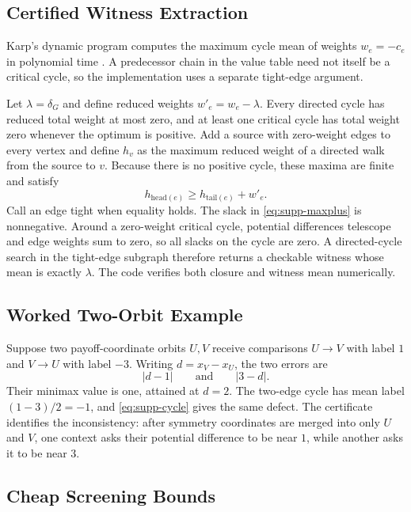 \subsection{Certified Witness Extraction}

Karp's dynamic program computes the maximum cycle mean of weights $w_e=-c_e$ in polynomial time \cite{karp1978cycle}.  A predecessor chain in the value table need not itself be a critical cycle, so the implementation uses a separate tight-edge argument.

Let $\lambda=\delta_G$ and define reduced weights $w'_e=w_e-\lambda$.  Every directed cycle has reduced total weight at most zero, and at least one critical cycle has total weight zero whenever the optimum is positive.  Add a source with zero-weight edges to every vertex and define $h_v$ as the maximum reduced weight of a directed walk from the source to $v$.  Because there is no positive cycle, these maxima are finite and satisfy
\begin{equation}
h_{\mathrm{head}(e)}
\ge
h_{\mathrm{tail}(e)}+w'_e.
\label{eq:supp-maxplus}
\end{equation}
Call an edge tight when equality holds.  The slack in \eqref{eq:supp-maxplus} is nonnegative.  Around a zero-weight critical cycle, potential differences telescope and edge weights sum to zero, so all slacks on the cycle are zero.  A directed-cycle search in the tight-edge subgraph therefore returns a checkable witness whose mean is exactly $\lambda$.  The code verifies both closure and witness mean numerically.

\subsection{Worked Two-Orbit Example}

Suppose two payoff-coordinate orbits $U,V$ receive comparisons
$U\to V$ with label $1$ and $V\to U$ with label $-3$.  Writing
$d=x_V-x_U$, the two errors are
\[
|d-1|
\qquad\text{and}\qquad
|3-d|.
\]
Their minimax value is one, attained at $d=2$.  The two-edge cycle has mean label $(1-3)/2=-1$, and \eqref{eq:supp-cycle} gives the same defect.  The certificate identifies the inconsistency: after symmetry coordinates are merged into only $U$ and $V$, one context asks their potential difference to be near $1$, while another asks it to be near $3$.

\subsection{Cheap Screening Bounds}

